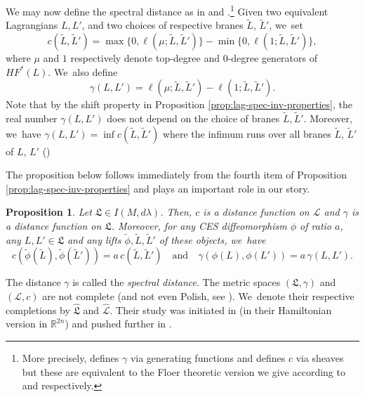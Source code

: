 \documentclass[JEP,XML,SOM,Unicode,NoFloatCountersInSection,published]{cedram}
\newtheorem{prop}[thm]{Proposition}
\theoremstyle{definition}
\newcommand {\LL}{{\mathcal L}}
\newcommand{\R}{\mathbb{R}}
\newcommand{\fL}{\mathfrak {L}}
\newcommand{\hatL}{\widehat{\fL}}
\newcommand{\hatLL}{\widehat{\LL}}
\begin{document}
We may now define the spectral distance as in \cite{Viterbo-STAGGF} and \cite{Viterbo-gammas}.\footnote{More precisely, \cite{Viterbo-STAGGF} defines $\gamma$ via generating functions and \cite{Viterbo-gammas} defines $c$ via sheaves but these are equivalent to the Floer theoretic version we give according to \cite{Milinkovic-Oh} and \cite{Viterbo-Sheaves} respectively.}
Given two equivalent Lagrangians $L, L'$, and two choices of respective branes $\tilde L$, $\tilde L'$, we~set
\begin{equation*}
c(\tilde L,\tilde L')=\max\{0, \ell(\mu; \tilde L, \tilde L')\}- \min \{0,\ell(1; \tilde L,\tilde L')\},
\end{equation*}
where $\mu$ and $1$ respectively denote top-degree and $0$-degree generators of $HF^*(L)$. We~also define
\begin{equation*}
\gamma(L,L')=\ell(\mu; \tilde L, \tilde L')-\ell(1; \tilde L,\tilde L').
\end{equation*}
Note that by the shift property in Proposition \ref{prop:lag-spec-inv-properties}, the real number $\gamma(L,L')$ does not depend on the choice of branes $\tilde L, \tilde L'$. Moreover, we~have $\gamma(L, L')=\inf c(\tilde L, \tilde L')$ where the infimum runs over all branes $\tilde L$, $\tilde L'$ of $L$, $L'$ (\cite[Prop.\,5.2]{Viterbo-gammas})

The proposition below follows immediately from the fourth item of Proposition \ref{prop:lag-spec-inv-properties} and plays an important role in our story.

\begin{prop}\label{prop:gamma} Let $\fL\in I(M, d\lambda)$. Then, $c$ is a distance function on $\LL$ and $\gamma$ is a distance function on $\fL$. Moreover, for any CES diffeomorphism $\phi$ of ratio $a$, any $L, L'\in\fL$ and any lifts $\tilde \phi, \tilde L, \tilde L'$ of these objects, we~have
\begin{equation*}
c(\tilde \phi (\tilde L), \tilde \phi(\tilde L'))=a\, c(\tilde L,\tilde L')\quad \text{and}\quad \gamma(\phi(L), \phi(L'))=a\,\gamma(L, L').
\end{equation*}
\end{prop}

The distance $\gamma$ is called the \emph{spectral distance}. The metric spaces $(\fL,\gamma)$ and $(\LL,c)$ are not complete (and not even Polish, see \cite[Prop.\,A.1]{Viterbo-gammas}). We~denote their respective completions by $\hatL$ and $\hatLL$. Their study was initiated in \cite{Humiliere-completion} (in their Hamiltonian version in $\R^{2n}$) and pushed further in \cite{Viterbo-gammas}.
\end{document}
